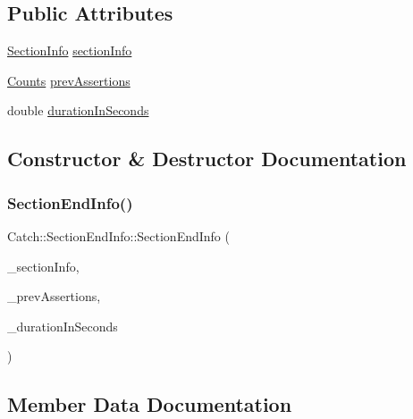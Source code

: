 \subsection*{Public Attributes}
\begin{DoxyCompactItemize}
\item 
\hyperlink{struct_catch_1_1_section_info}{Section\+Info} \hyperlink{struct_catch_1_1_section_end_info_a2d44793392cb83735d086d726822abe9}{section\+Info}
\item 
\hyperlink{struct_catch_1_1_counts}{Counts} \hyperlink{struct_catch_1_1_section_end_info_ae70b154cbc05b5dd2901d97f89303d8c}{prev\+Assertions}
\item 
double \hyperlink{struct_catch_1_1_section_end_info_a7c262f2dab9cff166b8eca620c47eea5}{duration\+In\+Seconds}
\end{DoxyCompactItemize}


\subsection{Constructor \& Destructor Documentation}
\hypertarget{struct_catch_1_1_section_end_info_abc9381c7c22b6907317ec985ccaa6713}{}\label{struct_catch_1_1_section_end_info_abc9381c7c22b6907317ec985ccaa6713} 
\subsubsection{\texorpdfstring{Section\+End\+Info()}{SectionEndInfo()}}
{\footnotesize\ttfamily Catch\+::\+Section\+End\+Info\+::\+Section\+End\+Info (\begin{DoxyParamCaption}\item[{\hyperlink{struct_catch_1_1_section_info}{Section\+Info} const \&}]{\+\_\+section\+Info,  }\item[{\hyperlink{struct_catch_1_1_counts}{Counts} const \&}]{\+\_\+prev\+Assertions,  }\item[{double}]{\+\_\+duration\+In\+Seconds }\end{DoxyParamCaption})\hspace{0.3cm}{\ttfamily [inline]}}



\subsection{Member Data Documentation}
\hypertarget{struct_catch_1_1_section_end_info_a7c262f2dab9cff166b8eca620c47eea5}{}\label{struct_catch_1_1_section_end_info_a7c262f2dab9cff166b8eca620c47eea5} 
